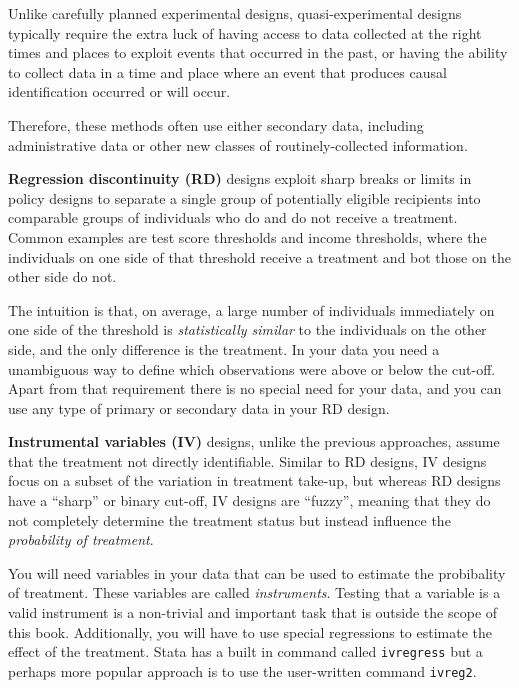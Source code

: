 Unlike carefully planned experimental designs,
quasi-experimental designs typically require the extra luck
of having access to data collected at the right times and places
to exploit events that occurred in the past,
or having the ability to collect data in a time and place
where an event that produces causal identification occurred or will occur.

Therefore, these methods often use either secondary data,
including administrative data or other new classes of routinely-collected information.


\textbf{Regression discontinuity (RD)} designs exploit sharp breaks or limits
in policy designs to separate a single group of potentially eligible recipients
into comparable groups of individuals who do and do not receive a treatment. 
Common examples are test score thresholds and income thresholds, 
where the individuals on one side of that threshold receive a treatment and bot those on the other side do not.

The intuition is that, on average, a large number of individuals immediately on one side of the threshold
is \textit{statistically similar} to the individuals on the other side, 
and the only difference is the treatment. 
In your data you need a unambiguous way to define which observations were above or below the cut-off.
Apart from that requirement there is no special need for your data,
and you can use any type of primary or secondary data in your RD design.



\textbf{Instrumental variables (IV)} designs, unlike the previous approaches,
assume that the treatment not directly identifiable.
Similar to RD designs,
IV designs focus on a subset of the variation in treatment take-up, 
but whereas RD designs have a ``sharp'' or binary cut-off,
IV designs are ``fuzzy'', meaning that they do not completely determine
the treatment status but instead influence the \textit{probability of treatment}.

You will need variables in your data that can be used to estimate the probibality of treatment. 
These variables are called \textit{instruments}. 
Testing that a variable is a valid instrument is a non-trivial and important task
that is outside the scope of this book.
Additionally, you will have to use special regressions to estimate the effect of the treatment.
Stata has a built in command called \texttt{ivregress} but a perhaps more popular approach is to use the user-written command \texttt{ivreg2}.

